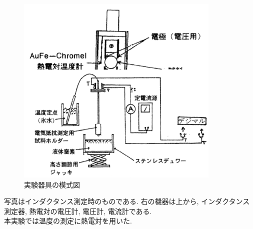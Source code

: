 \documentclass[11pt]{ltjsarticle}
\begin{document}
\begin{figure}[H]
\begin{minipage}[H]{0.48\textwidth}
          \includegraphics[width=\columnwidth]{jikkenkigu2.png}
          \caption{実験器具の模式図}
          \label{fig:kigu_fig}
        \end{minipage}
      \end{figure}
      写真はインダクタンス測定時のものである. 右の機器は上から, インダクタンス測定器, 熱電対の電圧計, 電圧計, 電流計である.\\
      本実験では温度の測定に熱電対を用いた.
\end{document}
